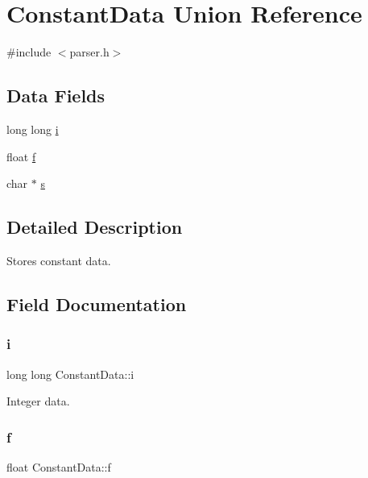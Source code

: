 \hypertarget{union_constant_data}{}\section{Constant\+Data Union Reference}
\label{union_constant_data}


{\ttfamily \#include $<$parser.\+h$>$}

\subsection*{Data Fields}
\begin{DoxyCompactItemize}
\item 
long long \hyperlink{union_constant_data_ab3b4d0908d9b4edaed52cdd9a8ec88d3}{i}
\item 
float \hyperlink{union_constant_data_a9c3282f50d2b4fb9752bb55fed6d1ed2}{f}
\item 
char $\ast$ \hyperlink{union_constant_data_aee1ab22b8dd076717f5de146f8939b46}{s}
\end{DoxyCompactItemize}


\subsection{Detailed Description}
Stores constant data. 

\subsection{Field Documentation}
\mbox{\label{union_constant_data_ab3b4d0908d9b4edaed52cdd9a8ec88d3}} 
\subsubsection{\texorpdfstring{i}{i}}
{\footnotesize\ttfamily long long Constant\+Data\+::i}

Integer data. \mbox{\label{union_constant_data_a9c3282f50d2b4fb9752bb55fed6d1ed2}} 
\subsubsection{\texorpdfstring{f}{f}}
{\footnotesize\ttfamily float Constant\+Data\+::f}

